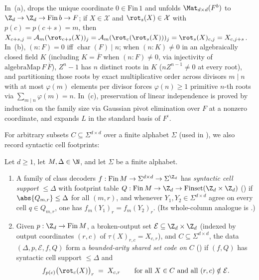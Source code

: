 \begin{outline}
In~(a),  drops the unique coordinate $0 \in \mathrm{Fin}\,1$ and
 unfolds $\Mat_{d\times d}(F^b)$ to
$\Z_d \to \Z_d \to \mathrm{Fin}\,b \to F$; if $X \in \mathcal{X}$ and $\rot_s(X) \in \mathcal{X}$ with
$p(c) = p(c + s) = m$, then
$X_{c+s, j} = \mathcal{A}_m(\rot_{c+s}(X))_j = \mathcal{A}_m(\rot_c(\rot_s(X)))_j =
\rot_s(X)_{c, j} = X_{c, j+s}$. In~(b), $(n : F) = 0$ iff $\operatorname{char}(F) \mid n$; when
$(n : K) \ne 0$ in an algebraically closed field $K$ (including $K = \overline{F}$ when
$(n : F) \ne 0$, via injectivity of $\mathrm{algebraMap}\,F\,\overline{F}$), $Z^n - 1$ has $n$
distinct roots in $K$ ($n Z^{n-1} \ne 0$ at
every root), and partitioning those roots by exact multiplicative order across divisors $m \mid n$
with at most $\varphi(m)$ elements per divisor forces $\varphi(n) \ge 1$ primitive $n$-th roots via
$\sum_{m \mid n} \varphi(m) = n$. In~(c), preservation of linear independence is proved by induction on
the family size via Gaussian pivot elimination over $F$ at a nonzero coordinate, and
 expands $L$ in the standard basis of $F^\iota$.
\end{outline}

For arbitrary subsets $C \subseteq \Sigma^{d\times d}$ over a finite alphabet $\Sigma$ (used in
), we also record syntactic cell footprints:

\begin{definition}\label{def:bounded-arity-set-code}
Let $d \ge 1$, let $M, \Delta \in \N$, and let $\Sigma$ be a finite alphabet.
\begin{enumerate}[label=(\alph*)]
\item A family of class decoders $f : \mathrm{Fin}\,M \to \Sigma^{d\times d} \to \Sigma^{\Z_d}$ has
  \emph{syntactic cell support $\le \Delta$} with footprint table
  $Q : \mathrm{Fin}\,M \to \Z_d \to \mathrm{Finset}(\Z_d \times \Z_d)$
  () if $\abs{Q_{m,r}} \le \Delta$ for all $(m,r)$, and whenever
  $Y_1, Y_2 \in \Sigma^{d\times d}$ agree on every cell $q \in Q_{m,r}$, one has
  $f_m(Y_1)_r = f_m(Y_2)_r$. (Its whole-column analogue is .)
\item Given $p : \Z_d \to \mathrm{Fin}\,M$, a broken-output set
  $\mathcal{E} \subseteq \Z_d \times \Z_d$ (indexed by output coordinates $(r,c)$ of
  $\tau(X)_{r,c} = X_{c,r}$), and $C \subseteq \Sigma^{d\times d}$, the data
  $(\Delta, p, \mathcal{E}, f, Q)$ form a \emph{bounded-arity shared set code on $C$}
  () if $(f, Q)$ has syntactic cell support $\le \Delta$ and
  \[
    f_{p(c)}\bigl(\rot_c(X)\bigr)_r \;=\; X_{c,r}
    \qquad
    \text{for all } X \in C \text{ and all } (r,c) \notin \mathcal{E}.
  \]
\end{enumerate}
\end{definition}

